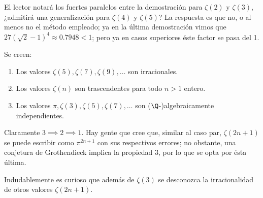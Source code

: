 \documentclass[teoria-numeros.tex]{subfiles}
\begin{document}
El lector notará los fuertes paralelos entre la demostración para $\zeta(2)$ y $\zeta(3)$, ¿admitirá una generalización para $\zeta(4)$ y $\zeta(5)$?
La respuesta es que no, o al menos no el método empleado; ya en la última demostración vimos que $27(\sqrt{2} - 1)^4 \approx 0.7948 < 1$;
pero ya en casos superiores éste factor se pasa del 1.
\begin{con}
	Se creen:
	\begin{enumerate}
		\item Los valores $\zeta(5), \zeta(7), \zeta(9), \dots$ son irracionales.
		\item Los valores $\zeta(n)$ son trascendentes para todo $n > 1$ entero.
		\item Los valores $\pi, \zeta(3), \zeta(5), \zeta(7), \dots$ son ($\Q$-)algebraicamente independientes.
	\end{enumerate}
\end{con}
Claramente $3 \implies 2 \implies 1$.
Hay gente que cree que, similar al caso par, $\zeta(2n+1)$ se puede escribir como $\pi^{2n+1}$ con sus respectivos errores;
no obstante, una conjetura de Grothendieck implica la propiedad 3, por lo que se opta por ésta última.

Indudablemente es curioso que además de $\zeta(3)$ se desconozca la irracionalidad de otros valores $\zeta(2n+1)$.

\end{document}
